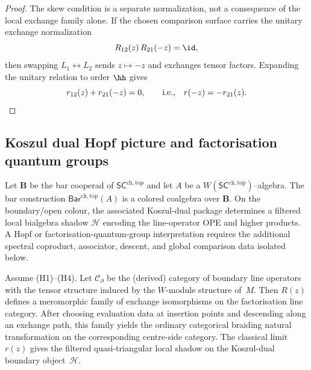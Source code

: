 \begin{proof}
The skew condition is a separate normalization, not a consequence of
the local exchange family alone.  If the chosen comparison surface
carries the unitary exchange normalization
\[
R_{12}(z)\,R_{21}(-z)=\id ,
\]
then swapping $L_1 \leftrightarrow L_2$ sends \(z\mapsto -z\) and
exchanges tensor factors.  Expanding the unitary relation to order
\(\hh\) gives
\[
r_{12}(z) + r_{21}(-z) = 0, \qquad\text{i.e.,}\quad r(-z) = -r_{21}(z). \qedhere
\]
\end{proof}

\subsection{Koszul dual Hopf picture and factorisation quantum groups}
Let $\mathbf B$ be the bar cooperad of
$\mathsf{SC}^{\mathrm{ch,top}}$ and let $A$ be a
$W(\mathsf{SC}^{\mathrm{ch,top}})$--algebra.
The bar construction $\mathsf{Bar}^{\mathrm{ch,top}}(A)$ is a colored
coalgebra over $\mathbf B$. On the boundary/open colour, the associated
Koszul-dual package determines a filtered local bialgebra shadow
$\mathcal H$ encoding the line-operator OPE and higher products. A Hopf
or factorisation-quantum-group interpretation requires the additional
spectral coproduct, associator, descent, and global comparison data
isolated below.

\begin{theorem}
Assume \textrm{(H1)--(H4)}.
Let $\mathcal C_{\partial}$ be the (derived) category of boundary line
operators with the tensor structure induced by the \(W\)-module
structure of~$M$. Then \(R(z)\) defines a meromorphic family of
exchange isomorphisms on the factorisation line category. After
choosing evaluation data at insertion points and descending along an
exchange path, this family yields the ordinary categorical braiding
natural transformation on the corresponding centre-side category. The
classical limit \(r(z)\) gives the filtered quasi-triangular local
shadow on the Koszul-dual boundary object~\(\mathcal H\).
\end{theorem}

